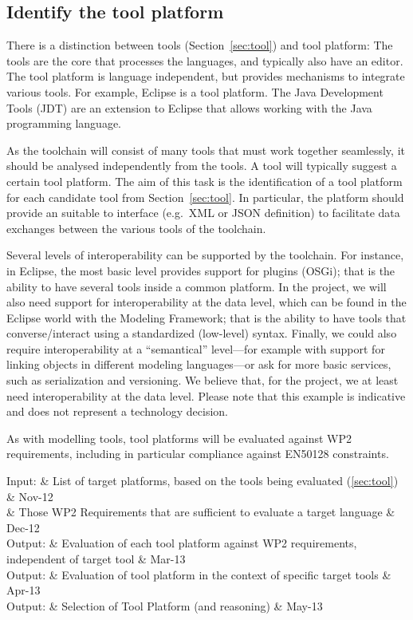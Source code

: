 \documentclass{template/openetcs_article}
\begin{document}
\subsection{Identify the tool platform}
\label{sec:tool_platform}

There is a distinction between tools (Section~\ref{sec:tool}) and tool
platform: The tools are the core that processes the languages, and
typically also have an editor. The tool platform is language
independent, but provides mechanisms to integrate various tools. For
example, Eclipse is a tool platform. The Java Development Tools (JDT)
are an extension to Eclipse that allows working with the Java
programming language.

As the toolchain will consist of many tools that must work together
seamlessly, it should be analysed independently from the tools. A tool
will typically suggest a certain tool platform. The aim of this task
is the identification of a tool platform for each candidate tool from
Section~\ref{sec:tool}. In particular, the platform should provide an
suitable to interface (e.g.~XML or JSON definition) to facilitate data
exchanges between the various tools of the toolchain.

Several levels of interoperability can be supported by the
toolchain. For instance, in Eclipse, the most basic level
provides support for plugins (OSGi); that is the ability to have
several tools inside a common platform. In the project, we will also
need support for interoperability at the data level, which can be
found in the Eclipse world with the Modeling Framework; that is the
ability to have tools that converse/interact using a standardized
(low-level) syntax. Finally, we could also require interoperability at
a ``semantical'' level---for example with support for linking objects
in different modeling languages---or ask for more basic services, such
as serialization and versioning. We believe that, for the project, we
at least need interoperability at the data level. Please note that this 
example is indicative and does not represent a technology decision.

As with modelling tools, tool platforms will be evaluated against WP2 
requirements, including in particular compliance against EN50128 constraints.

\begin{inoutput}
Input: & List of target platforms, based on the tools being evaluated (\ref{sec:tool}) & Nov-12 \\
& Those WP2 Requirements that are sufficient to evaluate a target language & Dec-12 \\
\hline
Output: & Evaluation of each tool platform against WP2 requirements, independent of target tool & Mar-13 \\
Output: & Evaluation of tool platform in the context of specific target tools & Apr-13 \\
Output: & Selection of Tool Platform (and reasoning) & May-13 \\
\end{inoutput}
\end{document}
